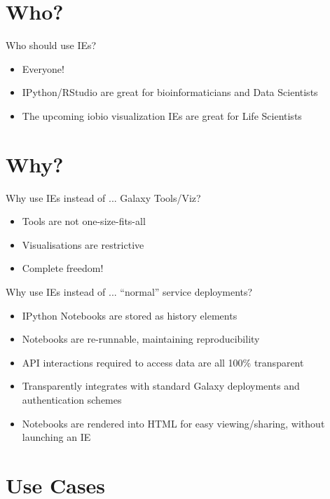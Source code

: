 \documentclass[12pt]{beamer} %
\begin{document}
\section{Who?}
  \begin{frame}{Who should use IEs?}
      \begin{itemize}
          \item Everyone!
          \item IPython/RStudio are great for bioinformaticians and Data Scientists 
          \item The upcoming iobio visualization IEs are great for Life Scientists 
      \end{itemize}
  \end{frame}

\section{Why?}
  \begin{frame}{Why use IEs instead of ... Galaxy Tools/Viz?}
      \begin{itemize}
          \item Tools are not one-size-fits-all
          \item Visualisations are restrictive
          \item Complete freedom!
      \end{itemize}
  \end{frame}
  
  \begin{frame}{Why use IEs instead of ... ``normal'' service deployments?}
      \begin{itemize}
          \item IPython Notebooks are stored as history elements
          \item Notebooks are re-runnable, maintaining reproducibility
          \item API interactions required to access data are all 100\% transparent
          \item Transparently integrates with standard Galaxy deployments and authentication schemes
          \item Notebooks are rendered into HTML for easy viewing/sharing, without launching an IE
      \end{itemize}
  \end{frame}
  
\section{Use Cases}
\end{document}
